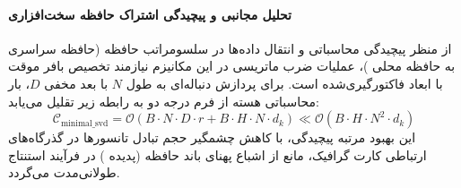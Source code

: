 \paragraph{تحلیل مجانبی و پیچیدگی اشتراک حافظه سخت‌افزاری}
از منظر پیچیدگی محاسباتی و انتقال داده‌ها در سلسومراتب حافظه (حافظه سراسری  به حافظه محلی )، عملیات ضرب ماتریسی در این مکانیزم نیازمند تخصیص بافر موقت با ابعاد فاکتورگیری‌شده است. برای پردازش دنباله‌ای به طول $N$ با بعد مخفی $D$، بار محاسباتی هسته از فرم درجه دو به رابطه زیر تقلیل می‌یابد:
\begin{equation}
\label{eq:complexity_minimal_svd}
\mathcal{C}_{\text{minimal\_svd}} = \mathcal{O}\left( B \cdot N \cdot D \cdot r + B \cdot H \cdot N \cdot d_k \right) \ll \mathcal{O}\left( B \cdot H \cdot N^2 \cdot d_k \right)
\end{equation}
این بهبود مرتبه پیچیدگی، با کاهش چشمگیر حجم تبادل تانسورها در گذرگاه‌های ارتباطی کارت گرافیک، مانع از اشباع پهنای باند حافظه (پدیده ) در فرآیند استنتاج طولانی‌مدت می‌گردد.